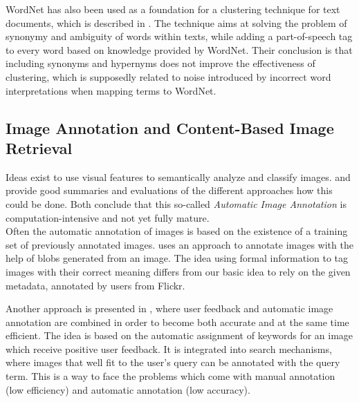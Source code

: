 \bigskip
WordNet has also been used as a foundation for a clustering technique for text documents, which is described in \cite{sedding2004wordnet}. The technique aims at solving the problem of synonymy and ambiguity of words within texts, while adding a part-of-speech tag to every word based on knowledge provided by WordNet. Their conclusion is that including synonyms and hypernyms does not improve the effectiveness of clustering, which is supposedly related to noise introduced by incorrect word interpretations when mapping terms to WordNet.

\subsection{Image Annotation and Content-Based Image Retrieval}

Ideas exist to use visual features to semantically analyze and classify images. \cite{Liu2007} and \cite{Zhang2012} provide good summaries and evaluations of the different approaches how this could be done. Both conclude that this so-called \emph{Automatic Image Annotation}  is computation-intensive and not yet fully mature. \\
Often the automatic annotation of images is based on the existence of a training set of previously annotated images.  \cite{jeon2003automatic}	uses an approach to annotate images with the help of blobs generated from an image. The idea using formal information to tag images with their correct meaning differs from our basic idea to rely on the given metadata, annotated by users from Flickr.

\bigskip
Another approach is presented in \cite{wenyin2001semi}, where user feedback and automatic image annotation are combined in order to become both accurate and at the same time efficient. The idea is based on the automatic assignment of keywords for an image which receive positive user feedback. It is integrated into search mechanisms, where images that well fit to the user's query can be annotated with the query term. This is a way to face the problems which come with manual annotation (low efficiency) and automatic annotation (low accuracy). 


